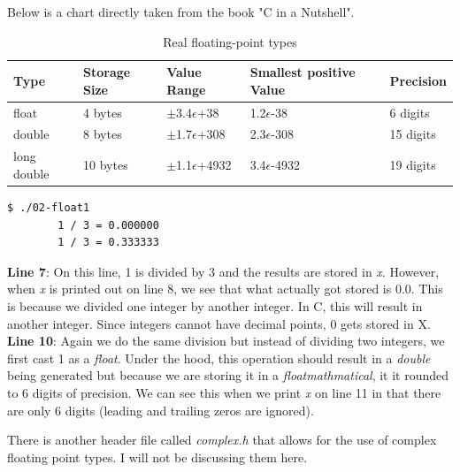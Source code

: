 \documentclass[../main.tex]{subfiles}
\begin{document}
	Below is a chart directly taken from the book "C in a Nutshell"\cite{c_nutshell}.
	\begin{table}[h]
		\centering
		\begin{tabular}{l l l l l}
			\toprule
			\textbf{Type} & \textbf{Storage Size} & \textbf{Value Range} & \textbf{Smallest positive Value} & \textbf{Precision}\\
			\midrule
			float\index{float} & 4 bytes & $\pm$3.4$\epsilon$+38 & 1.2$\epsilon$-38 & 6 digits \\
			double\index{double} & 8 bytes & $\pm$1.7$\epsilon$+308 & 2.3$\epsilon$-308 & 15 digits \\
			long double\index{long double} & 10 bytes & $\pm$1.1$\epsilon$+4932 & 3.4$\epsilon$-4932 & 19 digits \\
			\bottomrule
		\end{tabular}
		\caption{Real floating-point types}
		\label{tab:floating-point} %
	\end{table}

	
	
	\begin{lstlisting}[language=bash, numbers=none]
		$ ./02-float1 
		1 / 3 = 0.000000
		1 / 3 = 0.333333
	\end{lstlisting}
	
	\textbf{Line 7}: On this line, 1 is divided by 3 and the results are stored in \textit{x}.  However, when \textit{x} is printed out on line 8, we see that what actually got stored is 0.0.  This is because we divided one integer by another integer.  In C, this will result in another integer.  Since integers cannot have decimal points, 0 gets stored in X.\\
	\textbf{Line 10}: Again we do the same division but instead of dividing two integers, we first cast 1 as a \textit{float}.  Under the hood, this operation should result in a \textit{double} being generated but because we are storing it in a \textit{floatmathmatical}, it it rounded to 6 digits of precision.  We can see this when we print \textit{x} on line 11 in that there are only 6 digits (leading and trailing zeros are ignored).
	
	There is another header file called \textit{complex.h} that allows for the use of complex floating point types.  I will not be discussing them here.
	
\end{document}
